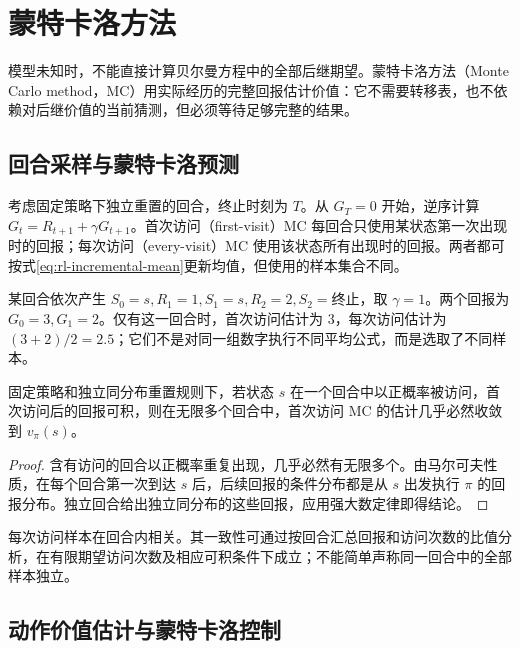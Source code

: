 \setcounter{chapter}{6} %
\chapter{蒙特卡洛方法}
\label{ch:rl-mc}

模型未知时，不能直接计算贝尔曼方程中的全部后继期望。蒙特卡洛方法（Monte Carlo method，MC）用实际经历的完整回报估计价值：它不需要转移表，也不依赖对后继价值的当前猜测，但必须等待足够完整的结果。

\section{回合采样与蒙特卡洛预测}

考虑固定策略下独立重置的回合，终止时刻为 $T$。从 $G_T=0$ 开始，逆序计算 $G_t=R_{t+1}+\gamma G_{t+1}$。首次访问（first-visit）MC 每回合只使用某状态第一次出现时的回报；每次访问（every-visit）MC 使用该状态所有出现时的回报。两者都可按式\eqref{eq:rl-incremental-mean}更新均值，但使用的样本集合不同。

\begin{example}[首次访问与每次访问]
某回合依次产生 $S_0=s,R_1=1,S_1=s,R_2=2,S_2=\text{终止}$，取 $\gamma=1$。两个回报为 $G_0=3,G_1=2$。仅有这一回合时，首次访问估计为 $3$，每次访问估计为 $(3+2)/2=2.5$；它们不是对同一组数字执行不同平均公式，而是选取了不同样本。
\end{example}

\begin{proposition}
固定策略和独立同分布重置规则下，若状态 $s$ 在一个回合中以正概率被访问，首次访问后的回报可积，则在无限多个回合中，首次访问 MC 的估计几乎必然收敛到 $v_\pi(s)$。
\end{proposition}
\begin{proof}
含有访问的回合以正概率重复出现，几乎必然有无限多个。由马尔可夫性质，在每个回合第一次到达 $s$ 后，后续回报的条件分布都是从 $s$ 出发执行 $\pi$ 的回报分布。独立回合给出独立同分布的这些回报，应用强大数定律即得结论。
\end{proof}

每次访问样本在回合内相关。其一致性可通过按回合汇总回报和访问次数的比值分析，在有限期望访问次数及相应可积条件下成立；不能简单声称同一回合中的全部样本独立。

\section{动作价值估计与蒙特卡洛控制}

